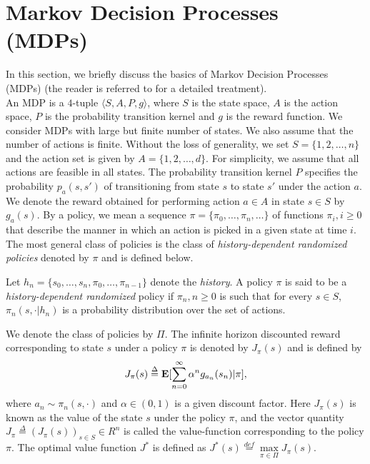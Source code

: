 \section{Markov Decision Processes (MDPs)}
In this section, we briefly discuss the basics of Markov Decision Processes (MDPs) (the reader is referred to \cite{BertB,Puter} for a detailed treatment).\\
An MDP is a $4$-tuple $\langle S,A,P,g\rangle$, where $S$ is the state space, $A$ is the action space, $P$ is the probability transition kernel and $g$ is the reward function. We consider MDPs with large but finite number of states. We also assume that the number of actions is finite.
Without the loss of generality, we set  $S=\{1,2,\ldots,n\}$  and the action set is given by $A=\{1,2,\ldots,d\}$. For simplicity, we assume that all actions are feasible in all states. The probability transition kernel $P$ specifies the probability $p_a(s,s')$ of transitioning from state $s$ to state $s'$ under the action $a$. We denote the reward obtained for performing action $a\in A$ in state $s\in S$ by $g_a(s)$.
By a policy, we mean a sequence $\pi=\{\pi_0,\ldots,\pi_n,\ldots\}$ of functions $\pi_i, i\geq 0$ that describe the manner in which an action is picked in a given state at time $i$. The most general class of policies is the class of \emph{history-dependent randomized policies} denoted by $\pi$ and is defined below.
\begin{definition}
Let $h_n=\{s_0,\ldots,s_n, \pi_0, \ldots, \pi_{n-1}\}$ denote the \emph{history}. A policy $\pi$ is said to be a \emph{history-dependent randomized} policy if $\pi_n,n\geq 0$ is such that for every $s\in S$, $\pi_n(s,\cdot|h_n)$ is a probability distribution over the set of actions.
\end{definition}
We denote the class of policies by $\Pi$. The infinite horizon discounted reward corresponding to state $s$ under a policy $\pi$ is denoted by $J_\pi(s)$ and is defined by
\begin{align}
J_\pi(s)\stackrel{\Delta}{=}\mathbf{E}[\sum_{n=0}^\infty \alpha^n g_{a_n}(s_n)|\pi],\nonumber
\end{align}
where $a_{n} \sim \pi_n(s,\cdot)$ and $\alpha \in (0,1)$ is a given discount factor.  Here $J_\pi(s)$ is known as the value of the state $s$ under the policy $\pi$, and the vector quantity $J_\pi\stackrel{\Delta}{=}(J_\pi(s))_{s\in S}\in R^n$ is called the value-function corresponding to the policy $\pi$. The optimal value function $J^*$ is defined as $J^*(s)\stackrel{def}{=}\underset{\pi \in \Pi}{\max} J_\pi(s)$.\par
